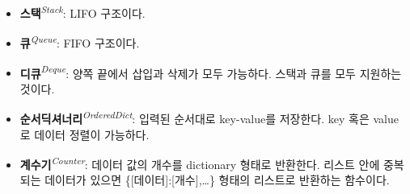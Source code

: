 \begin{itemize}
\item \textbf{스택}\textit{\textsuperscript{Stack}}: LIFO 구조이다.
\item \textbf{큐}\textit{\textsuperscript{Queue}}: FIFO 구조이다.
\item \textbf{디큐}\textit{\textsuperscript{Deque}}: 양쪽 끝에서 삽입과 삭제가 모두 가능하다. 스택과 큐를 모두 지원하는 것이다.
\item \textbf{순서딕셔너리}\textit{\textsuperscript{OrderedDict}}: 입력된 순서대로 key-value를 저장한다. key 혹은 value로 데이터 정렬이 가능하다.
\item \textbf{계수기}\textit{\textsuperscript{Counter}}: 데이터 값의 개수를 dictionary 형태로 반환한다. 리스트 안에 중복되는 데이터가 있으면 \{{[}데이터{]}:{[}개수{]},\ldots\} 형태의 리스트로 반환하는 함수이다.
\end{itemize}
